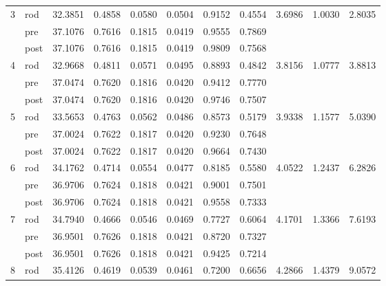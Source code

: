 \begin{table}[H]
\begin{tabular}{c l c c c c c c c c c}
        \midrule
        \multirow{3}{*}{3}  & rod  & 32.3851 & 0.4858 & 0.0580 & 0.0504 & 0.9152 & 0.4554 & 3.6986 & 1.0030 & 2.8035 \\
                            & pre  & 37.1076 & 0.7616 & 0.1815 & 0.0419 & 0.9555 & 0.7869 &        &        &        \\
                            & post & 37.1076 & 0.7616 & 0.1815 & 0.0419 & 0.9809 & 0.7568 &        &        &        \\
        \midrule
        \multirow{3}{*}{4}  & rod  & 32.9668 & 0.4811 & 0.0571 & 0.0495 & 0.8893 & 0.4842 & 3.8156 & 1.0777 & 3.8813 \\
                            & pre  & 37.0474 & 0.7620 & 0.1816 & 0.0420 & 0.9412 & 0.7770 &        &        &        \\
                            & post & 37.0474 & 0.7620 & 0.1816 & 0.0420 & 0.9746 & 0.7507 &        &        &        \\
        \midrule
        \multirow{3}{*}{5}  & rod  & 33.5653 & 0.4763 & 0.0562 & 0.0486 & 0.8573 & 0.5179 & 3.9338 & 1.1577 & 5.0390 \\
                            & pre  & 37.0024 & 0.7622 & 0.1817 & 0.0420 & 0.9230 & 0.7648 &        &        &        \\
                            & post & 37.0024 & 0.7622 & 0.1817 & 0.0420 & 0.9664 & 0.7430 &        &        &        \\
        \midrule
        \multirow{3}{*}{6}  & rod  & 34.1762 & 0.4714 & 0.0554 & 0.0477 & 0.8185 & 0.5580 & 4.0522 & 1.2437 & 6.2826 \\
                            & pre  & 36.9706 & 0.7624 & 0.1818 & 0.0421 & 0.9001 & 0.7501 &        &        &        \\
                            & post & 36.9706 & 0.7624 & 0.1818 & 0.0421 & 0.9558 & 0.7333 &        &        &        \\
        \midrule
        \multirow{3}{*}{7}  & rod  & 34.7940 & 0.4666 & 0.0546 & 0.0469 & 0.7727 & 0.6064 & 4.1701 & 1.3366 & 7.6193 \\
                            & pre  & 36.9501 & 0.7626 & 0.1818 & 0.0421 & 0.8720 & 0.7327 &        &        &        \\
                            & post & 36.9501 & 0.7626 & 0.1818 & 0.0421 & 0.9425 & 0.7214 &        &        &        \\
        \midrule
        \multirow{3}{*}{8}  & rod  & 35.4126 & 0.4619 & 0.0539 & 0.0461 & 0.7200 & 0.6656 & 4.2866 & 1.4379 & 9.0572 \\

\end{tabular}
\end{table}
